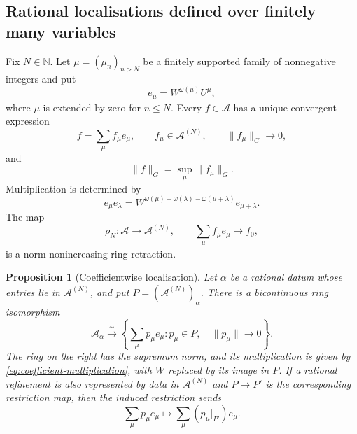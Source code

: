 \documentclass[11pt,reqno]{amsart}
\newtheorem{proposition}[proposition]{Proposition}
\theoremstyle{definition}
\begin{document}
\subsection{Rational localisations defined over finitely many variables}

Fix $N\in\mathbb N$.  Let
$\mu=(\mu_n)_{n>N}$ be a finitely supported family of nonnegative integers
and put
\[
  e_\mu=W^{\omega(\mu)}U^\mu,
\]
where $\mu$ is extended by zero for $n\leq N$.  Every
$f\in\mathcal A$ has a unique convergent expression
\begin{equation}\label{eq:coefficient-decomposition}
  f=\sum_\mu f_\mu e_\mu,
  \qquad
  f_\mu\in\mathcal A^{(N)},
  \qquad
  \lVert f_\mu\rVert_G\longrightarrow0,
\end{equation}
and
\[
  \lVert f\rVert_G=\sup_\mu\lVert f_\mu\rVert_G.
\]
Multiplication is determined by
\begin{equation}\label{eq:coefficient-multiplication}
  e_\mu e_\lambda
  =W^{\omega(\mu)+\omega(\lambda)-\omega(\mu+\lambda)}
   e_{\mu+\lambda}.
\end{equation}
The map
\[
  \rho_N:\mathcal A\longrightarrow\mathcal A^{(N)},
  \qquad
  \sum_\mu f_\mu e_\mu\longmapsto f_0,
\]
is a norm-nonincreasing ring retraction.

\begin{proposition}[Coefficientwise localisation]\label{prop:coefficientwise-localization}
Let $\alpha$ be a rational datum whose entries lie in
$\mathcal A^{(N)}$, and put
$P=(\mathcal A^{(N)})_\alpha$.  There is a bicontinuous ring isomorphism
\[
  \mathcal A_\alpha
  \xrightarrow{\ \sim\ }
  \left\{
    \sum_\mu p_\mu e_\mu:
    p_\mu\in P,\quad \lVert p_\mu\rVert\longrightarrow0
  \right\}.
\]
The ring on the right has the supremum norm, and its multiplication is
given by \eqref{eq:coefficient-multiplication}, with $W$ replaced by its
image in $P$.  If a rational refinement is also represented by data in
$\mathcal A^{(N)}$ and $P\to P'$ is the corresponding restriction map,
then the induced restriction sends
\[
  \sum_\mu p_\mu e_\mu
  \longmapsto
  \sum_\mu (p_\mu|_{P'})e_\mu.
\]
\end{proposition}
\end{document}
